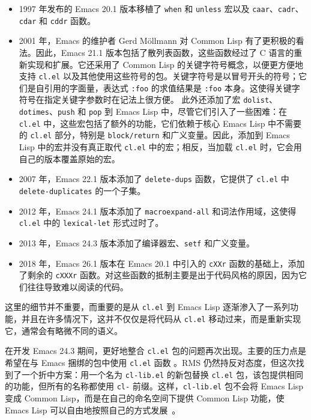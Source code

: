 \documentclass[format=acmsmall,screen]{acmart}
\begin{document}
\begin{itemize}
\item 1997 年发布的 Emacs 20.1 版本移植了 \texttt{when} 和 \texttt{unless} 宏以及 \texttt{caar}、\texttt{cadr}、\texttt{cdar} 和 \texttt{cddr} 函数。
\item 2001 年，Emacs 的维护者 Gerd Möllmann 对 Common Lisp 有了更积极的看法。因此，Emacs 21.1 版本包括了散列表函数，这些函数经过了 C 语言的重新实现和扩展。它还采用了 Common Lisp 的关键字符号概念，以便更方便地支持 \texttt{cl.el} 以及其他使用这些符号的包。关键字符号是以冒号开头的符号；它们是自引用的字面量，表达式 \texttt{:foo} 的求值结果是 \texttt{:foo} 本身。这使得关键字符号在指定关键字参数时在记法上很方便。 此外还添加了宏 \texttt{dolist}、\texttt{dotimes}、\texttt{push} 和 \texttt{pop} 到 Emacs Lisp 中，尽管它们引入了一些困难：在 \texttt{cl.el} 中，这些宏包括了额外的功能，它们依赖于核心 Emacs Lisp 中不需要的 \texttt{cl.el} 部分，特别是 \texttt{block/return} 和广义变量。因此，添加到 Emacs Lisp 中的宏并没有真正取代 \texttt{cl.el} 中的宏；相反，当加载 \texttt{cl.el} 时，它会用自己的版本覆盖原始的宏。
\item 2007 年，Emacs 22.1 版本添加了 \texttt{delete-dups} 函数，它提供了 \texttt{cl.el} 中 \texttt{delete-duplicates} 的一个子集。
\item 2012 年，Emacs 24.1 版本添加了 \texttt{macroexpand-all} 和词法作用域，这使得 \texttt{cl.el} 中的 \texttt{lexical-let} 形式过时了。
\item 2013 年，Emacs 24.3 版本添加了编译器宏、\texttt{setf} 和广义变量。
\item 2018 年，Emacs 26.1 版本在 Emacs 20.1 中引入的 \texttt{cXXr} 函数的基础上，添加了剩余的 \texttt{cXXXr} 函数。对这些函数的抵制主要是出于代码风格的原因，因为它们往往导致难以阅读的代码。
\end{itemize}

这里的细节并不重要，而重要的是从 \texttt{cl.el} 到 Emacs Lisp 逐渐渗入了一系列功能，并且在许多情况下，这并不仅仅是将代码从 \texttt{cl.el} 移动过来，而是重新实现它，通常会有略微不同的语义。

在开发 Emacs 24.3 期间，更好地整合 \texttt{cl.el} 包的问题再次出现。主要的压力点是希望在与 Emacs 捆绑的包中使用 \texttt{cl.el} 函数 。RMS 仍然持反对态度，但这次找到了一个折中方案：用一个名为 \texttt{cl-lib.el} 的新包替换 \texttt{cl.el} 包，该包提供相同的功能，但所有的名称都使用 \texttt{cl-} 前缀。这样，\texttt{cl-lib.el} 包不会将 Emacs Lisp 变成 Common Lisp，而是在自己的命名空间下提供 Common Lisp 功能，使 Emacs Lisp 可以自由地按照自己的方式发展~\cite{RMS-cl-real}。
\end{document}
